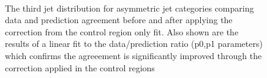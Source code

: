\begin{figure}[tbhp]
    \begin{center}
         ~~
        \\
        \caption{The third jet \pt distribution for asymmetric jet categories comparing data and prediction agreement before and after applying the correction from the control region only fit. Also shown are the results of a linear fit to the data/prediction ratio (p0,p1 parameters) which confirms the agreeement is significantly improved through the correction applied in the control regions}
    \end{center}
\end{figure}
